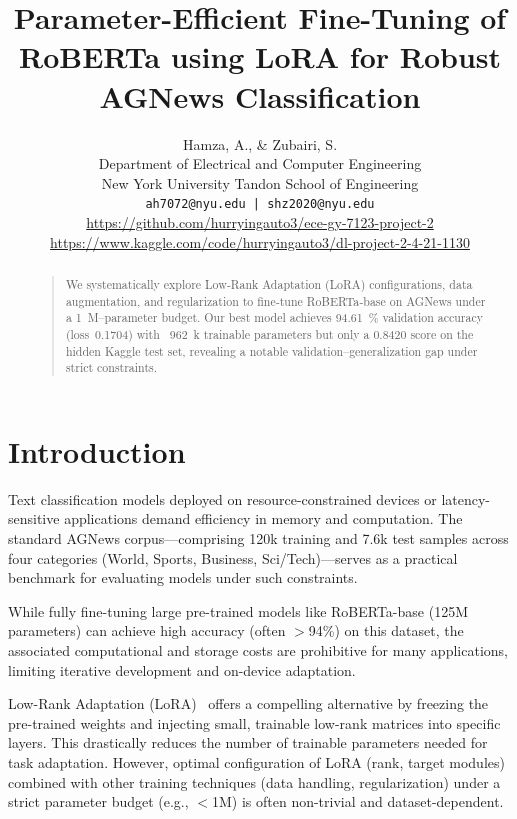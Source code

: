 \documentclass[letterpaper]{article}
\begin{document}
\title{Parameter-Efficient Fine-Tuning of RoBERTa using LoRA for Robust AGNews Classification}

\author{Hamza, A., \& Zubairi, S. \\
Department of Electrical and Computer Engineering\\
New York University Tandon School of Engineering\\
\texttt{ah7072@nyu.edu | shz2020@nyu.edu}\\
\url{https://github.com/hurryingauto3/ece-gy-7123-project-2}\\
\url{https://www.kaggle.com/code/hurryingauto3/dl-project-2-4-21-1130}
}
\maketitle

\begin{abstract}
    \begin{quote}
    We systematically explore Low‑Rank Adaptation (LoRA) configurations, data augmentation, and regularization to fine‑tune RoBERTa‑base on AGNews under a 1 M–parameter budget. Our best model achieves 94.61 \% validation accuracy (loss 0.1704) with ~962 k trainable parameters but only a 0.8420 score on the hidden Kaggle test set, revealing a notable validation–generalization gap under strict constraints.
    \end{quote}
    \end{abstract}

\section{Introduction}
Text classification models deployed on resource-constrained devices or latency-sensitive applications demand efficiency in memory and computation. The standard AGNews corpus—comprising 120k training and 7.6k test samples across four categories (World, Sports, Business, Sci/Tech)—serves as a practical benchmark for evaluating models under such constraints.

While fully fine-tuning large pre-trained models like RoBERTa-base (125M parameters) can achieve high accuracy (often $>$94\%) on this dataset, the associated computational and storage costs are prohibitive for many applications, limiting iterative development and on-device adaptation.

Low-Rank Adaptation (LoRA)~\cite{hu2022lora} offers a compelling alternative by freezing the pre-trained weights and injecting small, trainable low-rank matrices into specific layers. This drastically reduces the number of trainable parameters needed for task adaptation. However, optimal configuration of LoRA (rank, target modules) combined with other training techniques (data handling, regularization) under a strict parameter budget (e.g., $<$1M) is often non-trivial and dataset-dependent.
\end{document}
